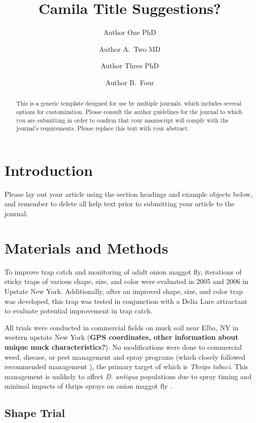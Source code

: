 \documentclass[alpha-refs]{wiley-article}
\title{Camila Title Suggestions?}
\author[1\authfn{1}]{Author One PhD}
\author[2\authfn{1}]{Author A.~Two MD}
\author[2\authfn{2}]{Author Three PhD}
\author[2]{Author B.~Four}
\affil[1]{Department, Institution, City, State or Province, Postal Code, Country}
\affil[2]{Department, Institution, City, State or Province, Postal Code, Country}
\begin{document}
\maketitle

\begin{abstract}
This is a generic template designed for use by multiple journals, which includes several options for customization. Please consult the author guidelines for the journal to which you are submitting in order to confirm that your manuscript will comply with the journal's requirements. Please replace this text with your abstract.

\end{abstract}

\section{Introduction}
Please lay out your article using the section headings and example objects below, and remember to delete all help text prior to submitting your article to the journal.


\section{Materials and Methods}

To improve trap catch and monitoring of adult onion maggot fly, iterations of sticky traps of various shape, size, and color were evaluated in 2005 and 2006 in Upstate New York.  Additionally, after an improved shape, size, and color trap was developed, this trap was tested in conjunction with a Delia Lure attractant to evaluate potential improvement in trap catch.  

All trials were conducted in commercial fields on muck soil near Elba, NY in western upstate New York (\textbf{GPS coordinates, other information about unique muck characteristics?}).  No modifications were done to commercial weed, disease, or pest management and spray programs (which closely followed recommended management \citep{reiners2011integrated}), the primary target of which is \textit{Thrips tabaci}.  This management is unlikely to affect \textit{D. antiqua} populations due to spray timing and minimal impacts of thrips sprays on onion maggot fly \citep{finch1986behavior}. 

\subsection{Shape Trial}
\end{document}
